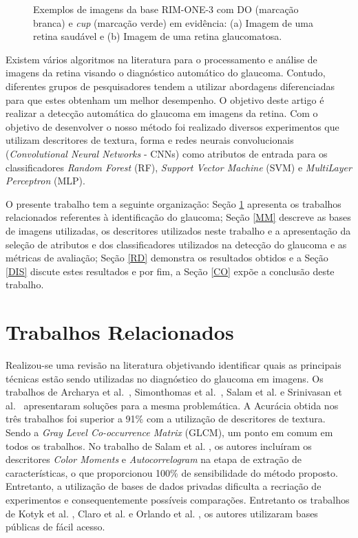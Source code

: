 \documentclass[fleqn,10pt]{SelfArx} %
\begin{document}
\begin{figure*}[h!]
	\centering
	\caption{Exemplos de imagens da base RIM-ONE-3 com DO (marcação branca) e \textit{cup} (marcação verde) em evidência: (a) Imagem de uma retina saudável e (b) Imagem de uma retina glaucomatosa.}
	\label{fig:ExemplosImgs}
\end{figure*}


Existem vários algoritmos na literatura para o processamento e análise de imagens da retina visando o diagnóstico automático do glaucoma. Contudo, diferentes grupos de pesquisadores tendem a utilizar abordagens diferenciadas para que estes obtenham um melhor desempenho. O objetivo deste artigo é realizar a detecção automática do glaucoma em imagens da retina. Com o objetivo de desenvolver o nosso método foi realizado diversos experimentos que utilizam descritores de textura, forma e redes neurais convolucionais (\textit{Convolutional Neural Networks} - CNNs) como atributos de entrada para os classificadores \textit{Random Forest} (RF), \textit{Support Vector Machine} (SVM) e \textit{MultiLayer Perceptron} (MLP).

O presente trabalho tem a seguinte organização: Seção \ref{TR} apresenta os trabalhos relacionados referentes à identificação do glaucoma; Seção \ref{MM} descreve as bases de imagens utilizadas, os descritores utilizados neste trabalho e a apresentação da seleção de atributos e dos classificadores utilizados na detecção do glaucoma e as métricas de avaliação; Seção \ref{RD} demonstra os resultados obtidos e a Seção \ref{DIS} discute estes resultados e por fim, a Seção \ref{CO} expõe a conclusão deste trabalho.


\section{Trabalhos Relacionados}
\label{TR}

Realizou-se uma revisão na literatura objetivando identificar quais as principais técnicas estão sendo utilizadas no diagnóstico do glaucoma em imagens. Os trabalhos de Archarya et al.~\cite{acharya2011automated}, Simonthomas et al.~\cite{simonthomas2014automated}, Salam et al. \cite{salam2016automated} e Srinivasan et al.~\cite{srinivasancomplex} apresentaram soluções para a mesma problemática. A Acurácia obtida nos três trabalhos foi superior a 91\% com a utilização de descritores de textura. Sendo a \textit{Gray Level Co-occurrence Matrix} (GLCM), um ponto em comum em todos os trabalhos. No trabalho de Salam et al. \cite{salam2016automated}, os autores incluíram os descritores \textit{Color Moments} e \textit{Autocorrelogram} na etapa de extração de características, o que proporcionou 100\% de sensibilidade do método proposto. Entretanto, a utilização de bases de dados privadas dificulta a recriação de experimentos e consequentemente possíveis comparações. Entretanto os trabalhos de Kotyk et al. \cite{kotyk2016semi}, Claro et al. \cite{claro2016automatic} e Orlando et al. \cite{orlando2017convolutional}, os autores utilizaram bases públicas de fácil acesso. 
\end{document}
